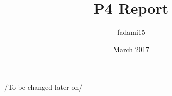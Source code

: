 \documentclass{article}
\title{P4 Report}
\author{fadami15 }
\date{March 2017}
\begin{document}
\maketitle

/To be changed later on/

\pagebreak


\end{document}
